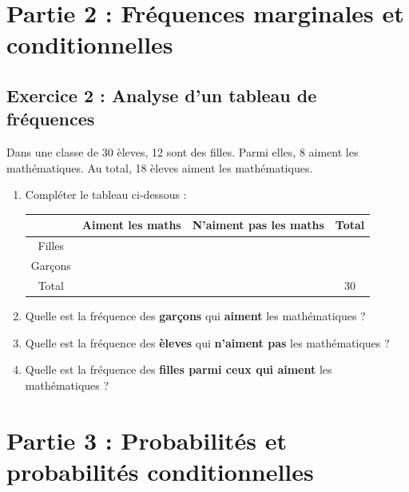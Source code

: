 \documentclass[12pt,a4paper]{article}
\begin{document}
\section*{Partie 2 : Fr\'equences marginales et conditionnelles}

\subsection*{Exercice 2 : Analyse d'un tableau de fr\'equences}

Dans une classe de 30 \`eleves, 12 sont des filles. Parmi elles, 8 aiment les math\'ematiques. Au total, 18 \`eleves aiment les math\'ematiques.

\begin{enumerate}
    \item Compl\'eter le tableau ci-dessous :
    
    \begin{center}
    \begin{tabular}{|c|c|c|c|}
    \hline
                 & Aiment les maths & N'aiment pas les maths & Total \\
    \hline
    Filles       &                   &                         &       \\
    \hline
    Gar\c{c}ons   &                   &                         &       \\
    \hline
    Total        &                   &                         & 30    \\
    \hline
    \end{tabular}
    \end{center}

    \item Quelle est la fr\'equence des \textbf{gar\c{c}ons} qui \textbf{aiment} les math\'ematiques ?
    \item Quelle est la fr\'equence des \textbf{\`eleves} qui \textbf{n'aiment pas} les math\'ematiques ?
    \item Quelle est la fr\'equence des \textbf{filles parmi ceux qui aiment} les math\'ematiques ?
\end{enumerate}

\vspace{0.5cm}
\begin{tcolorbox}[colframe=black, colback=white, width=\linewidth]
\vspace{10cm}
\end{tcolorbox}

\section*{Partie 3 : Probabilit\'es et probabilit\'es conditionnelles}
\end{document}
